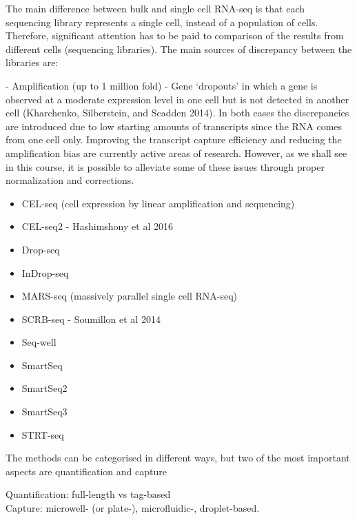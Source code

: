 The main difference between bulk and single cell RNA-seq is that each sequencing library represents a single cell, instead of a population of cells. 
Therefore, significant attention has to be paid to comparison of the results from different cells (sequencing libraries). 
The main sources of discrepancy between the libraries are:

 - Amplification (up to 1 million fold)
 - Gene ‘dropouts’ in which a gene is observed at a moderate expression level in one cell but is not detected in another cell (Kharchenko, Silberstein, and Scadden 2014).
In both cases the discrepancies are introduced due to low starting amounts of transcripts since the RNA comes from one cell only. 
Improving the transcript capture efficiency and reducing the amplification bias are currently active areas of research. 
However, as we shall see in this course, it is possible to alleviate some of these issues through proper normalization and corrections.

\begin{itemize}
    \item CEL-seq (cell expression by linear amplification and sequencing) \cite{hashimshony2012cel}
    \item CEL-seq2 - Hashimshony et al 2016
    \item Drop-seq \cite{macosko2015highly}
    \item InDrop-seq \cite{klein2015droplet}
    \item MARS-seq (massively parallel single cell RNA-seq) \cite{jaitin2014massively}
    \item SCRB-seq - Soumillon et al 2014
    \item Seq-well \cite{gierahn2017seq}
    \item SmartSeq \cite{ramskold2012full}
    \item SmartSeq2 \cite{picelli2013smart}
    \item SmartSeq3 \cite{hagemann2020single}
    \item STRT-seq \cite{islam2011characterization}
\end{itemize}



The methods can be categorised in different ways, but two of the most important aspects are quantification and capture

Quantification: full-length vs tag-based\\

Capture: microwell- (or plate-), microfluidic-, droplet-based.\\



